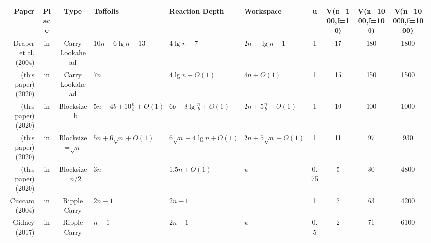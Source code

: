 \begin{tabular}{r|c|c|l|l|l|c|c|c|c}
Paper                                                &Place &Type                   &Toffolis                         &Reaction Depth                 &Workspace                  &u    &V(n=100,f=10) &V(n=1000,f=100) &V(n=10000,f=1000) \\
\hline
Draper et al. (2004) \cite{draper2004lookaheadadder} &in    &Carry Lookahead        &$10n - 6\lg n - 13$              &$4\lg n + 7$                   &$2n - \lg n - 1$           &1    &17            &180             &1800              \\
(this paper) (2020)                                  &in    &Carry Lookahead        &$7n$                             &$4\lg n + O(1)$                &$4n + O(1)$                &1    &15            &150             &1500              \\
(this paper) (2020)                                  &in    &Blocksize=b            &$5n - 4b + 10\frac{n}{b} + O(1)$ &$6b + 8\lg \frac{n}{b} + O(1)$ &$2n + 5\frac{n}{b} + O(1)$ &1    &10            &100             &1000              \\
(this paper) (2020)                                  &in    &Blocksize=$\sqrt{n}$   &$5n + 6\sqrt{n} + O(1)$          &$6\sqrt{n} + 4\lg n + O(1)$    &$2n + 5\sqrt{n} + O(1)$    &1    &11            &97              &930               \\
(this paper) (2020)                                  &in    &Blocksize=$n/2$        &$3n$                             &$1.5n + O(1)$                  &$n$                        &0.75 &5             &80              &4800              \\
Cuccaro (2004) \cite{cuccaro2004adder}               &in    &Ripple Carry           &$2n - 1$                         &$2n - 1$                       &$1$                        &1    &3             &63              &4200              \\
Gidney (2017) \cite{gidney2018halving}               &in    &Ripple Carry           &$n - 1$                          &$2n - 1$                       &$n$                        &0.5  &2             &71              &6100              \\


\end{tabular}
